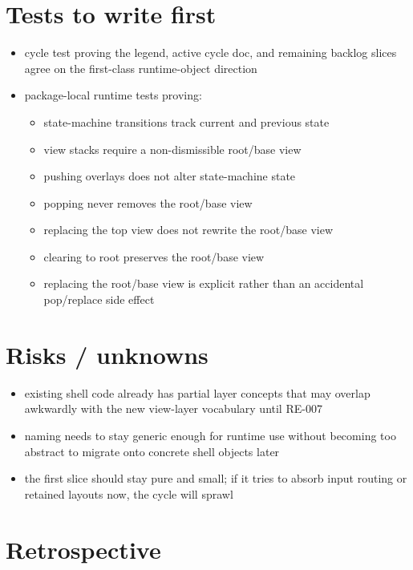 \section{Tests to write first}\label{record-150-tests-to-write-first}

\begin{itemize}
\tightlist
\item
  cycle test proving the legend, active cycle doc, and remaining backlog slices agree on the first-class runtime-object direction
\item
  package-local runtime tests proving:

  \begin{itemize}
  \tightlist
  \item
    state-machine transitions track current and previous state
  \item
    view stacks require a non-dismissible root/base view
  \item
    pushing overlays does not alter state-machine state
  \item
    popping never removes the root/base view
  \item
    replacing the top view does not rewrite the root/base view
  \item
    clearing to root preserves the root/base view
  \item
    replacing the root/base view is explicit rather than an accidental pop/replace side effect
  \end{itemize}
\end{itemize}

\section{Risks / unknowns}\label{record-150-risks-unknowns}

\begin{itemize}
\tightlist
\item
  existing shell code already has partial layer concepts that may overlap awkwardly with the new view-layer vocabulary until RE-007
\item
  naming needs to stay generic enough for runtime use without becoming too abstract to migrate onto concrete shell objects later
\item
  the first slice should stay pure and small; if it tries to absorb input routing or retained layouts now, the cycle will sprawl
\end{itemize}

\section{Retrospective}\label{record-150-retrospective}

